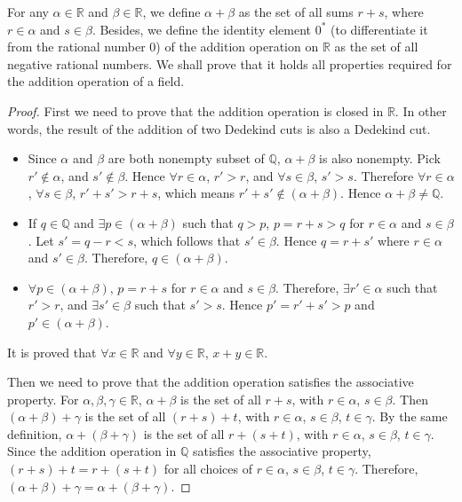 \documentclass{article}
\begin{document}
For any $\alpha \in \mathbb{R}$ and $\beta \in \mathbb{R}$, we define 
$\alpha + \beta$ as the set of all sums $r + s$, where $r \in \alpha$ and 
$s \in \beta$. Besides, we define the identity element $0^*$ (to differentiate 
it from the rational number 0) of the addition operation on $\mathbb{R}$ as the 
set of all negative rational numbers. We shall prove that it holds all 
properties required for the addition operation of a field.
\begin{proof}
  First we need to prove that the addition operation is closed in $\mathbb{R}$. 
  In other words, the result of the addition of two Dedekind cuts is also a 
  Dedekind cut.
  \begin{itemize}
    \item Since $\alpha$ and $\beta$ are both nonempty subset of $\mathbb{Q}$, 
    $\alpha + \beta$ is also nonempty. Pick $r' \notin \alpha$, and 
    $s' \notin \beta$. Hence $\forall r \in \alpha$, $r' > r$, and 
    $\forall s \in \beta$, $s' > s$. Therefore $\forall r \in \alpha$, 
    $\forall s \in \beta$, $r' + s' > r + s$, which means 
    $r' + s' \notin (\alpha + \beta)$. Hence $\alpha + \beta \neq \mathbb{Q}$.
    \item If $q \in \mathbb{Q}$ and $\exists p \in (\alpha + \beta)$ such that 
    $q > p$, $p = r + s > q$ for $r \in \alpha$ and $s \in \beta$. Let 
    $s' = q - r < s$, which follows that $s' \in \beta$. Hence $q = r + s'$ 
    where $r \in \alpha$ and $s' \in \beta$. Therefore, $q \in (\alpha + \beta)$.
    \item $\forall p \in (\alpha + \beta)$, $p = r + s$ for $r \in \alpha$ and 
    $s \in \beta$. Therefore, $\exists r' \in \alpha$ such that $r' > r$, and 
    $\exists s' \in \beta$ such that $s' > s$. Hence $p' = r' + s' > p$ and 
    $p' \in (\alpha + \beta)$.
  \end{itemize}
  It is proved that $\forall x \in \mathbb{R}$ and $\forall y \in \mathbb{R}$, 
  $x + y \in \mathbb{R}$.

  Then we need to prove that the addition operation satisfies the associative 
  property. For $\alpha, \beta, \gamma \in \mathbb{R}$, $\alpha + \beta$ is the 
  set of all $r + s$, with $r \in \alpha$, $s \in \beta$. Then 
  $(\alpha + \beta) + \gamma$ is the set of all $(r + s) + t$, with 
  $r \in \alpha$, $s \in \beta$, $t \in \gamma$. By the same definition, 
  $\alpha + (\beta + \gamma)$ is the set of all $r + (s + t)$, with 
  $r \in \alpha$, $s \in \beta$, $t \in \gamma$. Since the addition operation in 
  $\mathbb{Q}$ satisfies the associative property, $(r + s) + t = r + (s + t)$ 
  for all choices of $r \in \alpha$, $s \in \beta$, $t \in \gamma$. Therefore, 
  $(\alpha + \beta) + \gamma = \alpha + (\beta + \gamma)$.


\end{proof}
\end{document}
